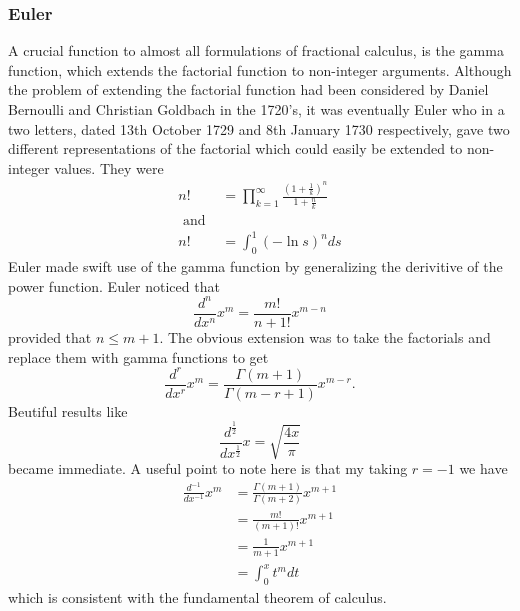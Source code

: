 \documentclass{unswmaths}
\begin{document}
\subsubsection*{Euler}
A crucial function to almost all formulations of fractional calculus, is the gamma function, which extends the factorial function
to non-integer arguments. Although the problem of extending the factorial function had been considered by Daniel Bernoulli and Christian Goldbach in the 1720's, it was eventually Euler who in a two letters, dated 13th October 1729 
and 8th January 1730 respectively, gave two different representations of the factorial which could easily be extended
to non-integer values.
They were
\begin{align*}
	n! &= \prod_{k=1}^\infty \frac{\left( 1 + \frac{1}{k} \right)^n}{1 + \frac{n}{k}} \\
	\text{ and } \\
	n! &= \int_0^1 (-\ln s)^n ds 
\end{align*}
Euler made swift use of the gamma function by generalizing the derivitive of the power function.
Euler noticed that 
$$
	\frac{d^n}{dx^n} x^m = \frac{m!}{n+1!} x^{m - n}
$$
provided that $ n \leq m + 1 $.
The obvious extension was to take the factorials and replace them with gamma functions to get
$$
    \frac{d^r}{dx^r} x^m = \frac{\Gamma (m+1)}{\Gamma (m - r + 1)} x^{m-r}.
$$
Beutiful results like 
$$
    \frac{d^\frac{1}{2}}{dx^\frac{1}{2}} x = \sqrt{\frac{4x}{\pi}}
$$
became immediate. 
A useful point to note here is that my taking $ r = -1 $ we have
\begin{align*}
    \frac{d^{-1}}{dx^{-1}} x^m  &= \frac{\Gamma(m+1)}{\Gamma(m + 2)} x^{m + 1} \\
                                &= \frac{m!}{(m+1)!}x^{m+1} \\
                                &= \frac{1}{m+1} x^{m+1} \\
                                &= \int_0^x t^m dt
\end{align*}
which is consistent with the fundamental theorem of calculus.
\end{document}
